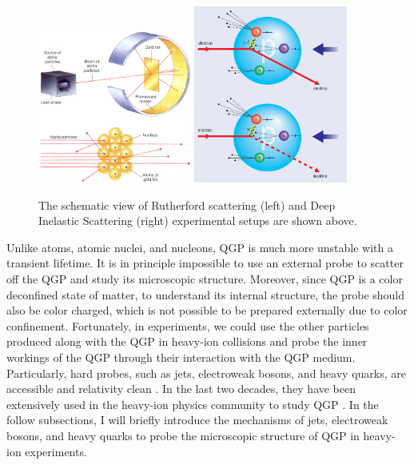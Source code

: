 \begin{figure}[hbtp]
\begin{center}
\includegraphics[width=0.45\textwidth]{Figures/Chapter1/Rutherford.jpg}
\includegraphics[width=0.45\textwidth]{Figures/Chapter1/DIS.jpg}
\caption{The schematic view of Rutherford scattering (left) and Deep Inelastic Scattering (right) experimental setups are shown above.}
\label{NuclearProbe}
\end{center}
\end{figure}   

Unlike atoms, atomic nuclei, and nucleons, QGP is much more unstable with a transient lifetime. It is in principle impossible to use an external probe to scatter off the QGP and study its microscopic structure. Moreover, since QGP is a color deconfined state of matter, to understand its internal structure, the probe should also be color charged, which is not possible to be prepared externally due to color confinement. Fortunately, in experiments, we could use the other particles produced along with the QGP in heavy-ion collisions and probe the inner workings of the QGP through their interaction with the QGP medium. Particularly, hard probes, such as jets, electroweak bosons, and heavy quarks, are accessible and relativity clean \cite{HardProbes}. In the last two decades, they have been extensively used in the heavy-ion physics community to study QGP \cite{HPSeries}. In the follow subsections, I will briefly introduce the mechanisms of jets, electroweak bosons, and heavy quarks to probe the microscopic structure of QGP in heavy-ion experiments.

